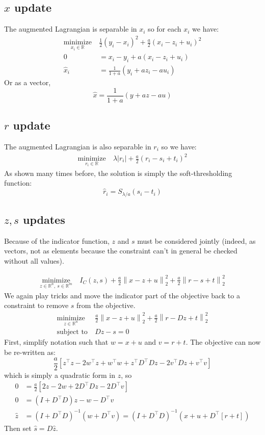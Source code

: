 \documentclass{article}
\newcommand{\op}[2]{{\ensuremath{\underset{ #2 }{\operatorname{ #1 }}~}}}
\newcommand{\norm}[1]{{ \ensuremath{ \left\lVert  #1 \right\rVert  }  }}
\begin{document}
\subsection{$x$ update}
The augmented Lagrangian is separable in $x_i$ so for each $x_i$ we have:
\begin{align*}
\op{minimize}{x_i\in\mathbb{R}}&  \frac{1}{2}(y_i-x_i)^2 + \frac{a}{2}(x_i-z_i+u_i)^2\\
0&=x_i-y_i + a(x_i-z_i+u_i)\\
\hat{x}_i&=\frac{1}{1+a}\left(y_i+az_i-au_i\right)
\end{align*}
Or as a vector,
$$\hat{x}=\frac{1}{1+a}\left(y+az-au\right)$$

\subsection{$r$ update}
The augmented Lagrangian is also separable in $r_i$ so we have:
\begin{align*}
\op{minimize}{r_i\in\mathbb{R}}&   \lambda |r_i| +\frac{a}{2}\left(r_i-s_i+t_i\right)^2
\end{align*}
As shown many times before, the solution is simply the soft-thresholding function:
$$\hat{r}_i=S_{\lambda/a}\left(s_i-t_i\right)$$

\subsection{$z, s$ updates}
Because of the indicator function, $z$ and $s$ must be considered jointly (indeed, as vectors, not as elements because the constraint can't in general
be checked without all values).

\begin{align*}
\op{minimize}{z\in\mathbb{R}^n,~ s\in\mathbb{R}^m}& I_C(z,s) + \frac{a}{2}\norm{x-z+u}_2^2+\frac{a}{2}\norm{r-s+t}_2^2
\end{align*}
We again play tricks and move the indicator part of the objective back to a constraint to remove $s$ from the objective.
\begin{align*}
\op{minimize}{z\in\mathbb{R}^n}& \frac{a}{2}\norm{x-z+u}_2^2+\frac{a}{2}\norm{r-Dz+t}_2^2\\
\textrm{subject to}~& Dz-s=0
\end{align*}
First, simplify notation such that $w=x+u$ and $v=r+t$.
The objective can now be re-written as:
$$\frac{a}{2}\left[z^\top z - 2w^\top z + w^\top w + z^\top D^\top D z
-2v^\top D z + v^\top v\right]$$
which is simply a quadratic form in $z$, so
\begin{align*}
0&=\frac{a}{2}\left[ 2z -2w + 2D^\top D z - 2D^\top v \right]\\
0&=(I+D^\top D)z - w - D^\top v\\
\hat{z}&=(I+D^\top D)^{-1}(w+D^\top v)=(I+D^\top D)^{-1}\left(x+u+D^\top[r+t]\right)
\end{align*}
Then set $\hat{s}=D\hat{z}$.
\end{document}
